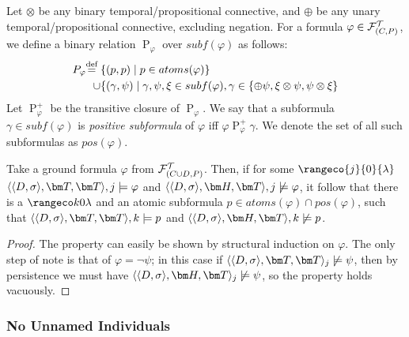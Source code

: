 \begin{definition}\label{def:pos-subformula}
  Let $\otimes$ be any binary temporal/propositional connective, and
  $\oplus$ be any unary temporal/propositional connective, excluding
  negation.  For a formula $\varphi \in \mathcal{F}_{(C,P)}^\mathcal{T}$, we define a binary
  relation $\mathrel{P}_{\varphi}$ over $subf(\varphi)$ as follows:
  \[
    \begin{aligned}
      \mathrel{P}_{\varphi} \stackrel{\text{def}}{=} \{ &(p,p) \mid p \in atoms(\varphi) \}\\
      \cup \{ &(\gamma, \psi) \mid
                  \gamma, \psi, \xi \in subf(\varphi), \gamma \in \{ \oplus \psi, \xi \otimes \psi, \psi \otimes \xi \}
    \end{aligned}
  \]
  Let $\mathrel{P}^{+}_{\varphi}$ be the transitive closure of
  $\mathrel{P}_{\varphi}$. We say that a subformula
  $\gamma \in subf(\varphi)$ is \emph{positive subformula} of
  $\varphi$ iff $\varphi \mathrel{P}^{+}_{\varphi} \gamma$. We denote
  the set of all such subformulas as $pos(\varphi)$.
\end{definition}

\begin{lemma}\label{lemma:t-not-h-atomic-subformula}
  Take a ground formula $\varphi$ from $\mathcal{F}_{(C \cup D,P)}^\mathcal{T}$. Then, if for some
  $\rangeco{j}{0}{\lambda}$\\ $\qttandt,j \models \varphi$ and
  $\qthandt,j \not\models \varphi$, it follow that there is a
  $\kinlambda$ and an atomic subformula
  $p \in atoms(\varphi) \cap pos(\varphi)$, such that
  $\qttandt,k \models p$ and $\qthandt,k \not\models p$.
\end{lemma}
\begin{proof}
  The property can easily be shown by structural induction on
  $\varphi$. The only step of note is that of $\varphi = \neg \psi$;
  in this case if $\qttandt_j \not\models \psi$, then by
  persistence we must have $\qthandt_j \not\models \psi$, so the
  property holds vacuously.
\end{proof}

\subsubsection{No Unnamed Individuals}

